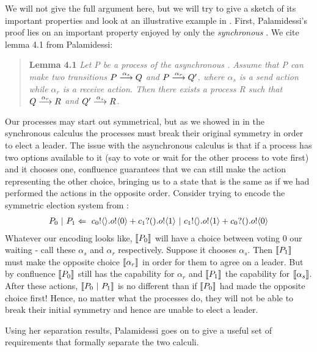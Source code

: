 We will not give the full argument here, but we will try to give a sketch of its important properties and look at an illustrative example in .  
First, Palamidessi's proof lies on an important property enjoyed by only the \emph{synchronous} \picalc.  
We cite lemma 4.1 from Palamidessi:
\begin{quote}
	\textbf{Lemma 4.1} \emph{Let P be a process of the asynchronous \picalc.  Assume that P can make two transitions $P \overset{{\alpha_s}}{\longrightarrow} Q$ and $P \overset{{\alpha_r}}{\longrightarrow} Q'$, where $\alpha_s$ is a send action while $\alpha_r$ is a receive action.  Then there exists a process R such that $Q \overset{{\alpha_r}}{\longrightarrow} R$ and $Q' \overset{{\alpha_s}}{\longrightarrow} R$.}
\end{quote}
Our processes may start out symmetrical, but as we showed in  in the synchronous calculus the processes must break their original symmetry in order to elect a leader.  
The issue with the asynchronous calculus is that if a process has two options available to it (say to vote or wait for the other process to vote first) and it chooses one, confluence guarantees that we can still make the action representing the other choice, bringing us to a state that is the same as if we had performed the actions in the opposite order.  
Consider trying to encode the symmetric election system from :
\begin{align}
	P_0\ |\  P_1 \Leftarrow\  {c_0}!\langle{}\rangle. {o}!\langle{0}\rangle + {c_1}?({}). {o}!\langle{1}\rangle \ |\  {c_1}!\langle{}\rangle. {o}!\langle{1}\rangle + {c_0}?({}). {o}!\langle{0}\rangle
	\label{leader_network_term2}	
\end{align}
Whatever our encoding looks like, $\llbracket{P_0}\rrbracket$ will have a choice between voting 0 our waiting - call these $\alpha_s$ and $\alpha_r$ respectively.  
Suppose it chooses $\alpha_s$.  
Then $\llbracket{P_1}\rrbracket$ must make the opposite choice $\llbracket{\alpha_r}\rrbracket$ in order for them to agree on a leader.  
But by confluence $\llbracket{P_0}\rrbracket$ still has the capability for $\alpha_r$ and $\llbracket{P_1}\rrbracket$ the capability for $\llbracket{\alpha_s}\rrbracket$.  
After these actions, $\llbracket{P_0  \ensuremath{\ |\ } P_1}\rrbracket$ is no different than if $\llbracket{P_0}\rrbracket$ had made the opposite choice first!  Hence, no matter what the processes do, they will not be able to break their initial symmetry and hence are unable to elect a leader.

Using her separation results, Palamidessi goes on to give a useful set of requirements that formally separate the two calculi.

